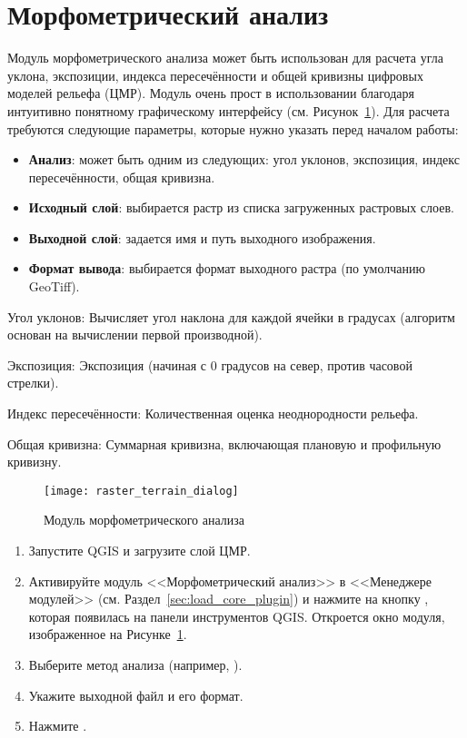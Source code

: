 
\section{Морфометрический анализ}


Модуль морфометрического анализа  может быть использован для расчета
угла уклона, экспозиции, индекса пересечённости и общей кривизны цифровых
моделей рельефа (ЦМР). Модуль очень прост в использовании благодаря
интуитивно понятному графическому интерфейсу
(см. Рисунок~\ref{fig:raster_terrain_dialog}). Для расчета требуются
следующие параметры, которые нужно указать перед началом работы:

\begin{itemize}[label=--]
\item \textbf{Анализ}: может быть одним из следующих: угол уклонов,
экспозиция, индекс пересечённости, общая кривизна.
\item \textbf{Исходный слой}: выбирается растр из списка загруженных растровых
слоев.
\item \textbf{Выходной слой}: задается имя и путь выходного изображения.
\item \textbf{Формат вывода}: выбирается формат выходного растра (по
умолчанию GeoTiff).
\end{itemize}

Угол уклонов: Вычисляет угол наклона для каждой ячейки в градусах (алгоритм
основан на вычислении первой производной).

Экспозиция: Экспозиция (начиная с 0 градусов на север, против часовой стрелки).

Индекс пересечённости: Количественная оценка неоднородности рельефа.

Общая кривизна: Суммарная кривизна, включающая плановую и профильную кривизну.

\begin{figure}[ht]
   \centering
   \texttt{[image: raster\_terrain\_dialog]}
   \caption{Модуль морфометрического анализа \nixcaption}\label{fig:raster_terrain_dialog}
\end{figure}

\label{raster_terrain_usage}

\begin{enumerate}
  \item Запустите QGIS и загрузите слой ЦМР.
  \item Активируйте модуль <<Морфометрический анализ>> в <<Менеджере модулей>>
  (см. Раздел~\ref{sec:load_core_plugin}) и нажмите на кнопку
  , которая появилась
  на панели инструментов QGIS. Откроется окно модуля, изображенное на
  Рисунке~\ref{fig:raster_terrain_dialog}.
  \item Выберите метод анализа (например, ).
  \item Укажите выходной файл и его формат.
  \item Нажмите .
\end{enumerate}

\FloatBarrier
